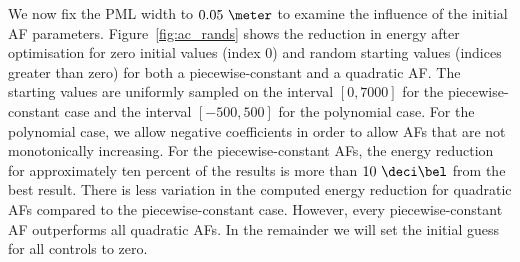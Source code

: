 \documentclass[a4paper]{article}
\begin{document}
We now fix the PML width to $0.05~\meter$ to examine the influence of
the initial AF parameters. Figure~\ref{fig:ac_rands} shows the
reduction in energy after optimisation for zero initial values (index
$0$) and random starting values (indices greater than zero) for both a
piecewise-constant and a quadratic AF.  The starting values are
uniformly sampled on the interval $[0, 7000]$ for the
piecewise-constant case and the interval $[-500, 500]$ for the
polynomial case. For the polynomial case, we allow negative
coefficients in order to allow AFs that are not monotonically
increasing. For the piecewise-constant AFs, the energy reduction for
approximately ten percent of the results is more than $10~\deci\bel$
from the best result.  There is less variation in the computed energy
reduction for quadratic AFs compared to the piecewise-constant
case. However, every piecewise-constant AF outperforms all quadratic
AFs. In the remainder we will set the initial guess for all controls
to zero.
\end{document}
